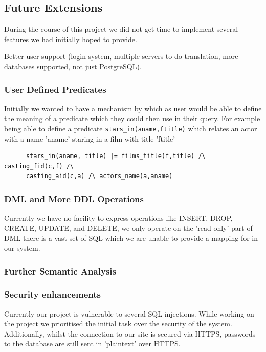 \documentclass[a4paper, 11pt]{article}
\begin{document}
  \subsection{Future Extensions}
    During the course of this project we did not get time to implement several
    features we had initially hoped to provide. 

    Better user support (login system, multiple servers to do translation,
    more databases supported, not just PostgreSQL).

    \subsubsection{User Defined Predicates}
    Initially we wanted to have a mechanism by which as user would be able to
    define the meaning of a predicate which they could then use in their query.
    For example being able to define a predicate
    \texttt{stars\_in(aname,ftitle)} which
    relates an actor with a name 'aname' staring in a film with title 'ftitle'

    \begin{verbatim}
      stars_in(aname, title) |= films_title(f,title) /\ casting_fid(c,f) /\
      casting_aid(c,a) /\ actors_name(a,aname)
    \end{verbatim}

    \subsubsection{DML and More DDL Operations}
    Currently we have no facility to express operations like INSERT, DROP, 
    CREATE, UPDATE, and DELETE, we only operate on the 'read-only' part of DML
    there is a vast set of SQL which we are unable to provide a mapping for
    in our system.
    \subsubsection{Further Semantic Analysis}
    
    \subsubsection{Security enhancements}
    Currently our project is vulnerable to several SQL injections. While working
    on the project we prioritised the initial task over the security of the
    system. Additionally, whilst the connection to our site is secured via
    HTTPS, passwords to the database are still sent in 'plaintext' over HTTPS.
\end{document}

